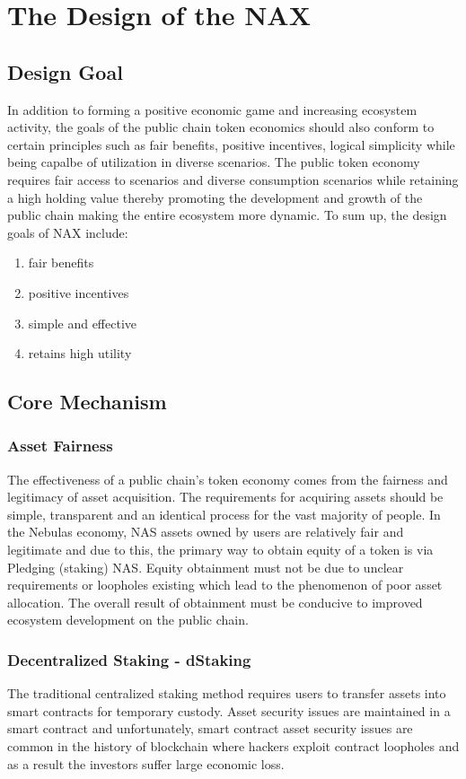 \section{The Design of the NAX}
\subsection{Design Goal}
In addition to forming a positive economic game and increasing ecosystem activity, the goals of the public chain token economics should also conform to certain principles such as fair benefits, positive incentives, logical simplicity while being capalbe of utilization in diverse scenarios. The public token economy requires fair access to scenarios and diverse consumption scenarios while retaining a high holding value thereby promoting the development and growth of the public chain making the entire ecosystem more dynamic. To sum up, the design goals of NAX include:

\begin{enumerate}[\hspace{2cm}(a)]
    \item fair benefits
    \item positive incentives
    \item simple and effective
    \item retains high utility
\end{enumerate}

\subsection{Core Mechanism}

\subsubsection{Asset Fairness}
The effectiveness of a public chain's token economy comes from the fairness and legitimacy of asset acquisition. The requirements for acquiring assets should be simple, transparent and an identical process for the vast majority of people. In the Nebulas economy, NAS assets owned by users are relatively fair and legitimate and due to this, the primary way to obtain equity of a token is via Pledging (staking) NAS. Equity obtainment must not be due to unclear requirements or loopholes existing which lead to the phenomenon of poor asset allocation. The overall result of obtainment must be conducive to improved ecosystem development on the public chain.

\subsubsection{Decentralized Staking - dStaking}
The traditional centralized staking method requires users to transfer assets into smart contracts for temporary custody. Asset security issues are maintained in a smart contract and unfortunately, smart contract asset security issues are common in the history of blockchain where hackers exploit contract loopholes and as a result the investors suffer large economic loss. 

